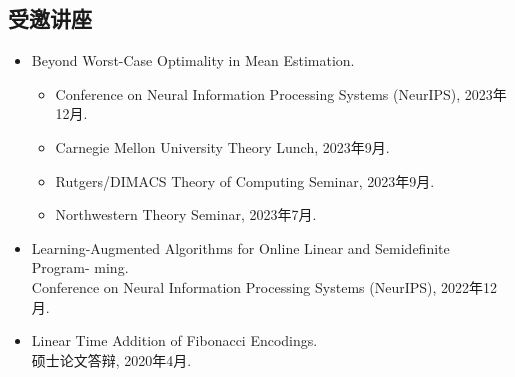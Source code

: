 \documentclass[margin, 10pt]{res} %
\begin{document}
\begin{resume}
\section{受邀讲座}
\begin{itemize}
\item Beyond Worst-Case Optimality in Mean Estimation.
\begin{itemize}
    \item Conference on Neural Information Processing Systems (NeurIPS), 2023年12月.
    \item Carnegie Mellon University Theory Lunch, 2023年9月.
    \item Rutgers/DIMACS Theory of Computing Seminar, 2023年9月.
    \item Northwestern Theory Seminar, 2023年7月.
\end{itemize}

\item Learning-Augmented Algorithms for Online Linear and Semidefinite Program-
ming.\\
Conference on Neural Information Processing Systems (NeurIPS), 2022年12月.
\item Linear Time Addition of Fibonacci Encodings.\\
硕士论文答辩, 2020年4月.
\end{itemize}


\end{resume}
\end{document}
